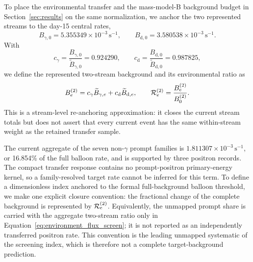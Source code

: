 \documentclass[11pt]{article}
\newcommand{\revblue}[1]{\textcolor{revisionblue}{#1}}
\newcommand{\cps}{\ensuremath{\,\mathrm{s^{-1}}}}
\begin{document}
To place the environmental transfer and the mass-model-B background budget in
Section~\ref{sec:results} on the same normalization, we anchor the two
represented streams to the day-15 central rates,
\[
 B_{\gamma,0}=5.355349\times10^{-3}\cps,\qquad
 B_{\mathrm d,0}=3.580538\times10^{-3}\cps .
\]
With
\[
 c_\gamma=\frac{B_{\gamma,0}}{\widetilde B_{\gamma,0}}=0.924290,
 \qquad
 c_{\mathrm d}=\frac{B_{\mathrm d,0}}{\widetilde B_{\mathrm d,0}}=0.987825,
\]
we define the represented two-stream background and its environmental ratio as
\begin{equation}
 B^{(2)}_e=c_\gamma\widetilde B_{\gamma,e}
          +c_{\mathrm d}\widetilde B_{\mathrm d,e},
 \qquad
 {\cal R}^{(2)}_e=\frac{B^{(2)}_e}{B^{(2)}_0}.
 \label{eq:environment_two_stream}
\end{equation}
This is a stream-level re-anchoring approximation: it closes the current
stream totals but does not assert that every current event has the same
within-stream weight as the retained transfer sample.

The current \revblue{aggregate of the seven non-$\gamma$ prompt families} is
$1.811307\times10^{-3}\cps$, or 16.854\% of the full balloon rate, and is
supported by three positron records. The compact transfer response contains no
prompt-positron primary-energy kernel, so a family-resolved target rate cannot
be inferred for this term. To define a dimensionless index anchored to the
formal full-background balloon threshold, we make one explicit closure
convention: the fractional change of the complete background is represented by
$ {\cal R}^{(2)}_e$. Equivalently, the unmapped prompt share is carried with the
aggregate two-stream ratio only in Equation~\eqref{eq:environment_flux_screen};
it is not reported as an independently transferred positron rate. This
convention is the leading unmapped systematic of the screening index, which is
therefore not a complete target-background prediction.
\end{document}
